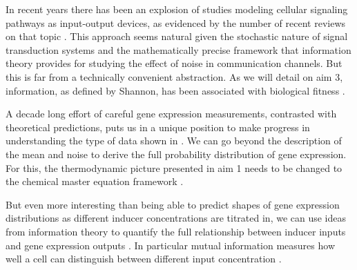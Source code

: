 In recent years there has been an explosion of studies modeling cellular
signaling pathways as input-output devices, as evidenced by the number of recent
reviews on that topic \cite{Rhee2012a, Levchenko2014, Tkacik2016, Bowsher2014,
Nemenman2010, Brennan2012}. This approach seems natural given the stochastic
nature of signal transduction systems and the mathematically precise framework
that information theory provides for studying the effect of noise in
communication channels. But this is far from a technically convenient
abstraction. As we will detail on aim 3, information, as defined by Shannon, has
been associated with biological fitness \cite{Taylor2007a, Bergstrom2004,
Donaldson-Matasci2010, Rivoire2011}.

A decade long effort of careful gene expression measurements, contrasted with
theoretical predictions, puts us in a unique position to make progress in
understanding the type of data shown in . We can go beyond
the description of the mean \cite{Garcia2011c} and noise \cite{Jones2014a} to
derive the full probability distribution of gene expression. For this, the
thermodynamic picture presented in aim 1 needs to be changed to the
chemical master equation framework \cite{Sanchez2013, Swain2016}.

But even more interesting than being able to predict shapes of gene expression
distributions as different inducer concentrations are titrated in, we can use
ideas from information theory to quantify the full relationship between inducer
inputs and gene expression outputs \cite{Tkacik2008a}. In particular mutual
information measures how well a cell can distinguish between different input
concentration \cite{Bowsher2014}.

